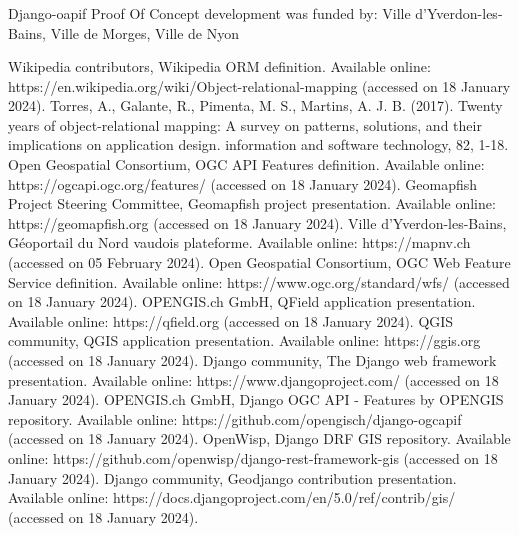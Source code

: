 \documentclass[runningheads]{llncs}
\begin{document}
\begin{credits}
\subsubsection{\ackname} Django-oapif Proof Of Concept development was funded by: Ville d'Yverdon-les-Bains, Ville de Morges, Ville de Nyon

\end{credits}
%
%
%
% 
% 
%
\pagebreak 
\begin{thebibliography}{8}
Wikipedia contributors, Wikipedia ORM definition. Available online: https://en.wikipedia.org/wiki/Object-relational-mapping (accessed on 18 January 2024).
Torres, A., Galante, R., Pimenta, M. S., Martins, A. J. B. (2017). Twenty years of object-relational mapping: A survey on patterns, solutions, and their implications on application design. information and software technology, 82, 1-18.
Open Geospatial Consortium, OGC API Features definition. Available online: https://ogcapi.ogc.org/features/ (accessed on 18 January 2024).
Geomapfish Project Steering Committee, Geomapfish project presentation. Available online: https://geomapfish.org (accessed on 18 January 2024).
Ville d'Yverdon-les-Bains, Géoportail du Nord vaudois plateforme. Available online: https://mapnv.ch (accessed on 05 February 2024).
Open Geospatial Consortium, OGC Web Feature Service definition. Available online: https://www.ogc.org/standard/wfs/ (accessed on 18 January 2024).
OPENGIS.ch GmbH, QField application presentation. Available online: https://qfield.org (accessed on 18 January 2024).
QGIS community, QGIS application presentation. Available online: https://ggis.org (accessed on 18 January 2024).
Django community, The Django web  framework presentation. Available online: https://www.djangoproject.com/ (accessed on 18 January 2024).
OPENGIS.ch GmbH, Django OGC API - Features by OPENGIS repository. Available online: https://github.com/opengisch/django-ogcapif (accessed on 18 January 2024).
OpenWisp, Django DRF GIS repository. Available online: https://github.com/openwisp/django-rest-framework-gis (accessed on 18 January 2024).
Django community, Geodjango contribution presentation. Available online: https://docs.djangoproject.com/en/5.0/ref/contrib/gis/ (accessed on 18 January 2024).



\end{thebibliography}
\end{document}
